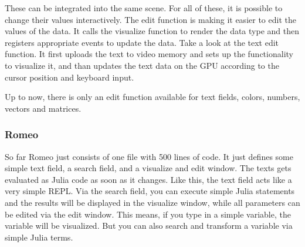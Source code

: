 These can be integrated into the same scene. For all of these, it is possible to change their values interactively.
The edit function is making it easier to edit the values of the data.
It calls the visualize function to render the data type and then registers appropriate events to update the data.
Take a look at the text edit function. 
It first uploads the text to video memory and sets up the functionality to visualize it, and than updates the text data on the GPU according to the cursor position and keyboard input.

Up to now, there is only an edit function available for text fields, colors, numbers, vectors and matrices.


\subsubsection{Romeo}
So far Romeo just consists of one file with 500 lines of code. It just defines some simple text field, a search field, and a visualize and edit window.
The texts gets evaluated as Julia code as soon as it changes. Like this, the text field acts like a very simple \ac{REPL}.
Via the search field, you can execute simple Julia statements and the results will be displayed in the visualize window, while all parameters can be edited via the edit window.
This means, if you type in a simple variable, the variable will be visualized. But you can also search and transform a variable via simple Julia terms.